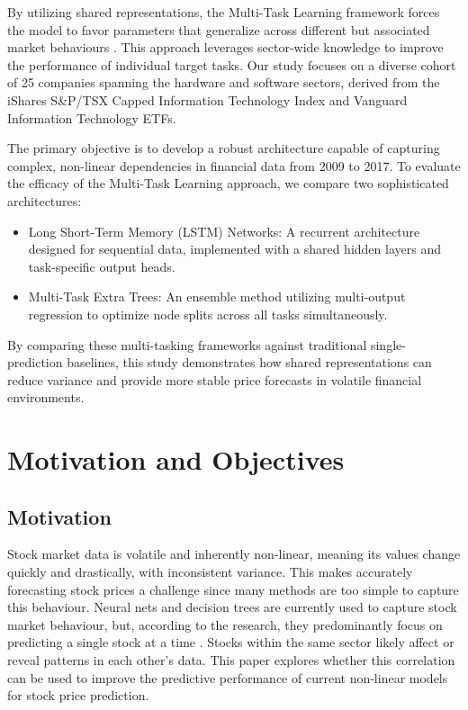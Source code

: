 \documentclass[conference]{IEEEtran}
\begin{document}
By utilizing shared representations, the Multi-Task Learning framework forces the model to favor
parameters that generalize across different but associated market behaviours \cite{pan2010survey}. This approach leverages 
sector-wide knowledge to improve the performance of individual target tasks. Our study focuses on 
a diverse cohort of 25 companies spanning the hardware and software sectors, derived from the 
iShares S\&P/TSX Capped Information Technology Index and Vanguard Information Technology ETFs. 

The primary objective is to develop a robust architecture capable of capturing complex, non-linear 
dependencies in financial data from 2009 to 2017. To evaluate the efficacy of the Multi-Task Learning 
approach, we compare two sophisticated architectures:
\begin{itemize}
\item Long Short-Term Memory (LSTM) Networks: A recurrent architecture designed for sequential data, 
    implemented with a shared hidden layers and task-specific output heads.
\item Multi-Task Extra Trees: An ensemble method utilizing multi-output regression to optimize node 
    splits across all tasks simultaneously.
\end{itemize}
By comparing these multi-tasking frameworks against traditional single-prediction baselines, 
this study demonstrates how shared representations can reduce variance and provide more stable 
price forecasts in volatile financial environments.

\section{Motivation and Objectives}
\subsection*{Motivation}
Stock market data is volatile and inherently non-linear, meaning its values change quickly and
drastically, with inconsistent variance. This makes accurately forecasting stock prices a challenge
since many methods are too simple to capture this behaviour. Neural nets and decision trees are
currently used to capture stock market behaviour, but, according to the research, they predominantly
focus on predicting a single stock at a time \cite{datadriven}. Stocks within the same sector likely
affect or reveal patterns in each other’s data. This paper explores whether this correlation can be
used to improve the predictive performance of current non-linear models for stock price prediction.
\end{document}

